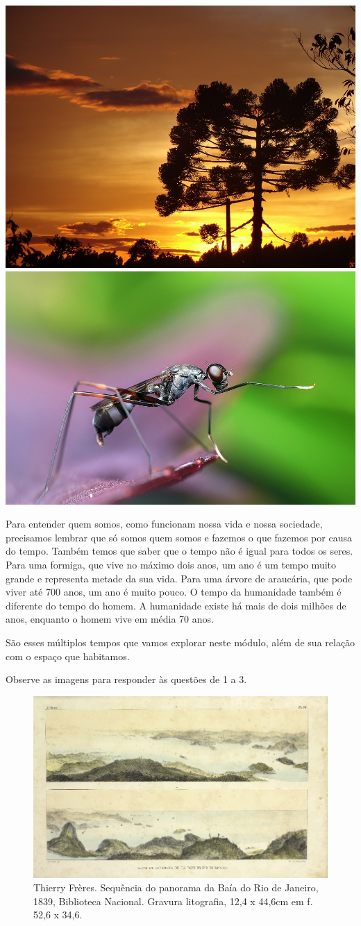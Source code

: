 \begin{itemize}
{\includegraphics[width=.5\textwidth]{./imgs/img27.png}
\includegraphics[width=.5\textwidth]{./imgs/img28.png}


Para entender quem somos, como funcionam nossa vida e nossa sociedade,
precisamos lembrar que só somos quem somos e fazemos o que fazemos por
causa do tempo. Também temos que saber que o tempo não é igual para
todos os seres. Para uma formiga, que vive no máximo dois anos, um ano é um
tempo muito grande e representa metade da sua vida. Para uma árvore de
araucária, que pode viver até 700 anos, um ano é muito pouco. O tempo da
humanidade também é diferente do tempo do homem. A humanidade existe há
mais de dois milhões de anos, enquanto o homem vive em média 70 anos.

São esses múltiplos tempos que vamos explorar neste módulo, além de sua
relação com o espaço que habitamos.}





Observe as imagens para responder às questões de 1 a 3.

\begin{figure}[htpb!]
\includegraphics[width=.5\textwidth]{./imgs/img29.jpg}
\caption{Thierry Frères. Sequência do panorama da Baía do Rio de Janeiro, 1839, Biblioteca Nacional. Gravura litografia, 12,4 x 44,6cm em f. 52,6 x 34,6.}
\end{figure}


\end{itemize}
